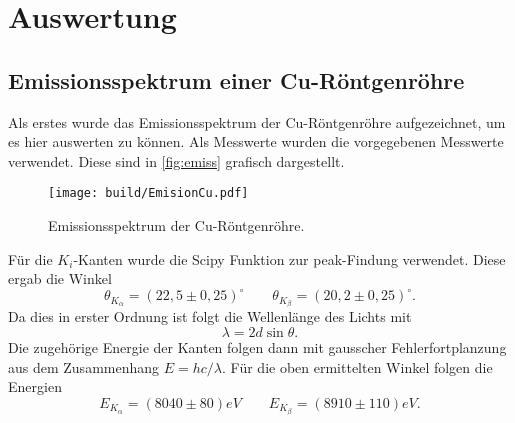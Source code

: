\section{Auswertung}
\label{sec:Auswertung}

\subsection{Emissionsspektrum einer Cu-Röntgenröhre}
\label{sec:Emissionsspektrum einer Cu-Röntgenröhre}
Als erstes wurde das Emissionsspektrum der Cu-Röntgenröhre aufgezeichnet, um es hier
auswerten zu können. Als Messwerte wurden die vorgegebenen Messwerte verwendet. Diese sind
in \autoref{fig:emiss} grafisch dargestellt.
\begin{figure}
	\centering
	\texttt{[image: build/EmisionCu.pdf]}
	\caption{Emissionsspektrum der Cu-Röntgenröhre.}
	\label{fig:emiss}
\end{figure}
Für die $K_i$-Kanten wurde die Scipy Funktion zur peak-Findung verwendet. Diese ergab die
Winkel
\begin{equation}
	\theta_{K_\alpha} = (22,5 \pm 0,25)^\circ
	\qquad
	\theta_{K_\beta} = (20,2 \pm 0,25)^\circ.
\end{equation}
Da dies in erster Ordnung ist folgt die Wellenlänge des Lichts mit
\begin{equation}
	\lambda = 2 d \sin\theta.
\end{equation}
Die zugehörige Energie der Kanten folgen dann mit gausscher Fehlerfortplanzung aus dem
Zusammenhang $E = hc / \lambda$. Für die oben ermittelten Winkel folgen die Energien
\begin{equation}
	E_{K_\alpha} = (8040 \pm 80) \si{eV}
	\qquad
	E_{K_\beta} = (8910 \pm 110) \si{eV}.
\end{equation}

